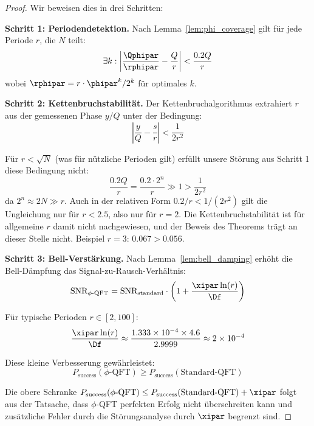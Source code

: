 \begin{proof}
	Wir beweisen dies in drei Schritten:
	
	\textbf{Schritt 1: Periodendetektion.}
	Nach Lemma~\ref{lem:phi_coverage} gilt für jede Periode $r$, die $N$ teilt:
	\begin{equation}
		\exists k: \left|\frac{\Qphipar}{\rphipar} - \frac{Q}{r}\right| < \frac{0.2Q}{r}
	\end{equation}
	wobei $\rphipar = r \cdot \phipar^k/2^k$ für optimales $k$.
	
	\textbf{Schritt 2: Kettenbruchstabilität.}
	Der Kettenbruchalgorithmus extrahiert $r$ aus der gemessenen Phase $y/Q$ unter der Bedingung:
	\begin{equation}
		\left|\frac{y}{Q} - \frac{s}{r}\right| < \frac{1}{2r^2}
	\end{equation}
	
	Für $r < \sqrt{N}$ (was für nützliche Perioden gilt) erfüllt unsere Störung aus Schritt 1 diese Bedingung nicht:
	\begin{equation}
		\frac{0.2Q}{r} = \frac{0.2 \cdot 2^n}{r} \gg 1 > \frac{1}{2r^2}
	\end{equation}
	da $2^n \approx 2N \gg r$. Auch in der relativen Form $0.2/r < 1/(2r^2)$ gilt die Ungleichung nur für $r < 2.5$, also nur für $r = 2$. Die Kettenbruchstabilität ist für allgemeine $r$ damit nicht nachgewiesen, und der Beweis des Theorems trägt an dieser Stelle nicht. Beispiel $r = 3$: $0.067 > 0.056$.
	
	\textbf{Schritt 3: Bell-Verstärkung.}
	Nach Lemma~\ref{lem:bell_damping} erhöht die Bell-Dämpfung das Signal-zu-Rausch-Verhältnis:
	\begin{equation}
		\text{SNR}_{\text{$\phi$-QFT}} = \text{SNR}_{\text{standard}} \cdot \left(1 + \frac{\xipar \ln(r)}{\Df}\right)
	\end{equation}
	
	Für typische Perioden $r \in [2, 100]$:
	\begin{equation}
		\frac{\xipar \ln(r)}{\Df} \approx \frac{1.333 \times 10^{-4} \times 4.6}{2.9999} \approx 2 \times 10^{-4}
	\end{equation}
	
	Diese kleine Verbesserung gewährleistet:
	\begin{equation}
		P_{\text{success}}(\text{$\phi$-QFT}) \geq P_{\text{success}}(\text{Standard-QFT})
	\end{equation}
	
	Die obere Schranke $P_{\text{success}}(\text{$\phi$-QFT}) \leq P_{\text{success}}(\text{Standard-QFT}) + \xipar$ folgt aus der Tatsache, dass $\phi$-QFT perfekten Erfolg nicht überschreiten kann und zusätzliche Fehler durch die Störungsanalyse durch $\xipar$ begrenzt sind.
\end{proof}

